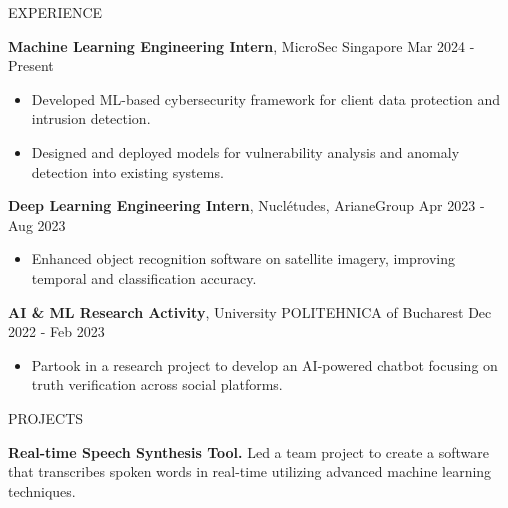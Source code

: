 \documentclass{resume} %
\begin{document}
\begin{rSection}{EXPERIENCE}

\textbf{Machine Learning Engineering Intern}, MicroSec Singapore \hfill {Mar 2024 - Present}\\
\begin{itemize}
    \itemsep -3pt {} 
     \item Developed ML-based cybersecurity framework for client data protection and intrusion detection.
     \item Designed and deployed models for vulnerability analysis and anomaly detection into existing systems.
 \end{itemize}
 
\textbf{Deep Learning Engineering Intern}, Nuclétudes, ArianeGroup \hfill {Apr 2023 - Aug 2023}\\
\begin{itemize}
    \itemsep -3pt {} 
     \item Enhanced object recognition software on satellite imagery, improving temporal and classification accuracy.
 \end{itemize}

\textbf{AI \& ML Research Activity}, University POLITEHNICA of Bucharest \hfill {Dec 2022 - Feb 2023}\\
\begin{itemize}
    \itemsep -3pt {} 
     \item Partook in a research project to develop an AI-powered chatbot focusing on truth verification across social platforms.
 \end{itemize}
\end{rSection} 


\begin{rSection}{PROJECTS}

\item \textbf{Real-time Speech Synthesis Tool.} {Led a team project to create a software that transcribes spoken words in real-time utilizing advanced machine learning techniques.}
\vspace{-1.25em}
\end{rSection} 

\end{document}
